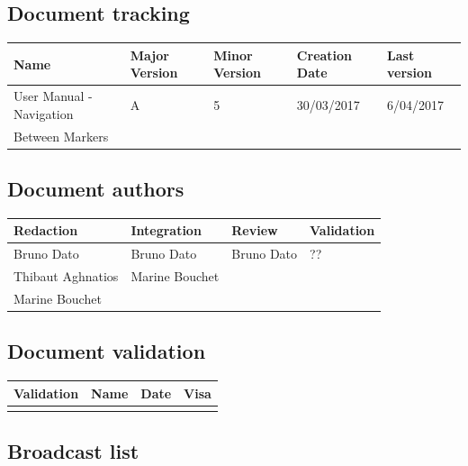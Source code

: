 \documentclass[10pt,a4paper]{article}
\begin{document}
\newpage


\subsection*{Document tracking}

\begin{center}
    \begin{tabular}{| l | l | l | l | l |}
    \hline
     \rowcolor{gray} Name & Major Version & Minor Version & Creation Date & Last version \\ \hline
    User Manual - Navigation & A & 5 & 30/03/2017 & 6/04/2017 \\ 
    Between Markers &  &  &  &  \\ \hline
    \end{tabular}
\end{center}


\subsection*{Document authors}

\begin{center}
    \begin{tabular}{| l | l | l | l |}
    \hline
    \rowcolor{gray} Redaction & Integration & Review & Validation \\ \hline
    Bruno Dato & Bruno Dato & Bruno Dato & ?? \\  
    Thibaut Aghnatios & Marine Bouchet &  &  \\  
    Marine Bouchet &  & &  \\  \hline
    \end{tabular}
\end{center}

\subsection*{Document validation}

\begin{center}
    \begin{tabular}{| l | l | l | l |}
    \hline
     \rowcolor{gray} Validation & Name & Date & Visa \\ \hline
    & & & \\
     \hline
    \end{tabular}
\end{center}

\subsection*{Broadcast list}
\end{document}
